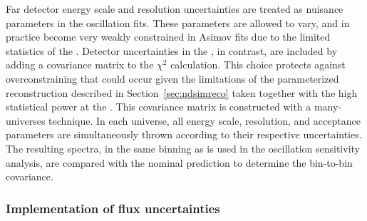 Far detector energy scale and resolution uncertainties are treated as nuisance parameters in the oscillation fits. These parameters are allowed to vary, and in practice become very weakly constrained in Asimov fits due to the limited statistics of the . Detector uncertainties in the , in contrast, are included by adding a covariance matrix to the $\chi^{2}$ calculation.  This choice protects against overconstraining that could occur given the limitations of the parameterized  reconstruction described in Section~\ref{sec:ndsimreco} taken together with the high statistical power at the .  This covariance matrix is constructed with a many-universes technique. In each universe, all  energy scale, resolution, and acceptance parameters are simultaneously thrown according to their respective uncertainties. The resulting spectra, in the same binning as is used in the oscillation sensitivity analysis, are compared with the nominal prediction to determine the bin-to-bin covariance.


\subsubsection{Implementation of flux uncertainties}
\label{sec:fluxPCA}


